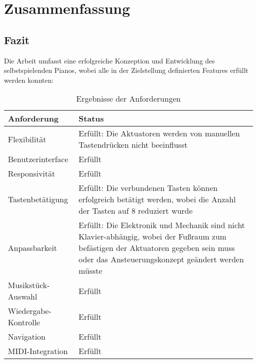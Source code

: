 
\chapter{Zusammenfassung} \label{fazit}
\nocite{*}
\section{Fazit}
Die Arbeit umfasst eine erfolgreiche Konzeption und Entwicklung des selbstspielenden Pianos, wobei alle in der Zielstellung
definierten Features erfüllt werden konnten: \newline

\begin{table}[htbp]
    \centering
    \begin{tabular}{|m{4cm}|m{8cm}|}
        \hline
        \textbf{Anforderung} &  \textbf{Status}  \\
        \hline
        Flexibilität & Erfüllt: Die Aktuatoren werden von manuellen Tastendrücken nicht beeinflusst \\
        \hline
        Benutzerinterface & Erfüllt \\
        \hline
        Responsivität & Erfüllt \\
        \hline
        Tastenbetätigung & Erfüllt: Die verbundenen Tasten können erfolgreich betätigt werden, wobei die Anzahl der Tasten auf
        8 reduziert wurde\\ %
        \hline
        Anpassbarkeit & Erfüllt: Die Elektronik und Mechanik sind nicht Klavier-abhängig, wobei der Fußraum zum befästigen der Aktuatoren
        gegeben sein muss oder das Ansteuerungskonzept geändert werden müsste\\
        \hline
        Musikstück-Auswahl & Erfüllt \\
        \hline
        Wiedergabe-Kontrolle & Erfüllt \\
        \hline
        Navigation & Erfüllt \\
        \hline
        MIDI-Integration & Erfüllt \\
        \hline
    \end{tabular}
    \caption{Ergebnisse der Anforderungen}
    \label{table:anorderungen-ergebnis}
\end{table}

